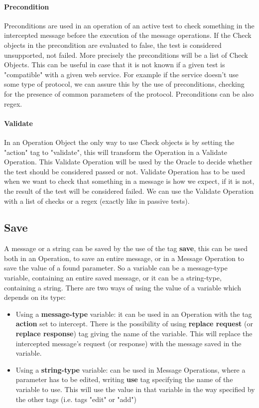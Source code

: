 \paragraph{Precondition}
Preconditions are used in an operation of an active test to check something in the intercepted message before the execution of the message operations. If the Check objects in the precondition are evaluated to false, the test is considered unsupported, not failed. More precisely the preconditions will be a list of Check Objects. This can be useful in case that it is not known if a given test is "compatible" with a given web service. For example if the service doesn't use some type of protocol, we can assure this by the use of preconditions, checking for the presence of common parameters of the protocol. Preconditions can be also regex.
\paragraph{Validate}
In an Operation Object the only way to use Check objects is by setting the "action" tag to "validate", this will transform the Operation in a Validate Operation. This Validate Operation will be used by the Oracle to decide whether the test should be considered passed or not. Validate Operation has to be used when we want to check that something in a message is how we expect, if it is not, the result of the test will be considered failed.
We can use the Validate Operation with a list of checks or a regex (exactly like in passive tests).

\subsection{Save}
A message or a string can be saved by the use of the tag \textbf{save}, this can be used both in an Operation, to save an entire message, or in a Message Operation to save the value of a found parameter. So a variable can be a message-type variable, containing an entire saved message, or it can be a string-type, containing a string.
There are two ways of using the value of a variable which depends on its type:
\begin{itemize}
    \item Using a \textbf{message-type} variable: it can be used in an Operation with the tag \textbf{action} set to intercept. There is the possibility of using \textbf{replace request} (or \textbf{replace response}) tag giving the name of the variable. This will replace the intercepted message's request (or response) with the message saved in the variable.
    \item Using a \textbf{string-type} variable: can be used in Message Operations, where a parameter has to be edited, writing \textbf{use} tag specifying the name of the variable to use. This will use the value in that variable in the way specified by the other tags (i.e. tags "edit" or "add")
\end{itemize}

